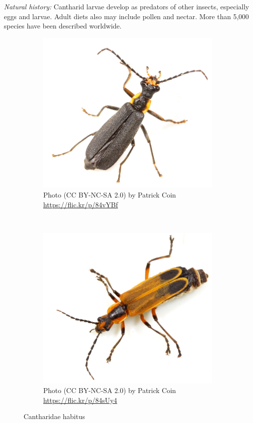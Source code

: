 \documentclass[letterpaper, 11pt]{article}
\begin{document}
\noindent{}\textit{Natural history:} Cantharid larvae develop as predators of other insects, especially eggs and larvae. Adult diets also may include pollen and nectar. More than 5,000 species have been described worldwide. 

\begin{figure}[ht!]
  \centering
\begin{subfigure}[ht!]{0.42\textwidth}
    \includegraphics[width=\textwidth]{CantharidHabitus1}
  \caption{Photo (CC BY-NC-SA 2.0) by Patrick Coin \url{https://flic.kr/p/84vYBf}}
  \label{fig:cantharid1}
\end{subfigure}
    ~
\begin{subfigure}[ht!]{0.42\textwidth}
    \includegraphics[width=\textwidth]{CantharidHabitus2}
  \caption{Photo (CC BY-NC-SA 2.0) by Patrick Coin \url{https://flic.kr/p/84sUy4}}
  \label{fig:cantharid2}\end{subfigure}
    \caption{Cantharidae habitus}\label{fig:cantharids}
\end{figure}
\end{document}

